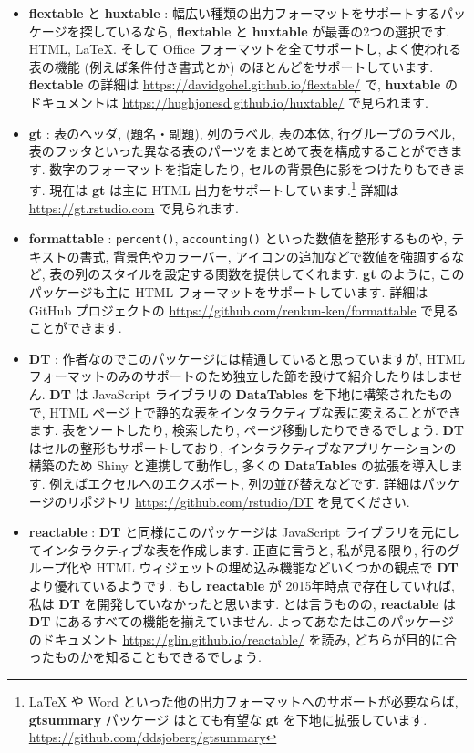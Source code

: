 \documentclass[
  11pt,
  lualatex,
  ja=standard]{bxjsreport}
\begin{document}
\begin{itemize}
\item
  \textbf{flextable} \autocite{R-flextable} と \textbf{huxtable} \autocite{R-huxtable}: 幅広い種類の出力フォーマットをサポートするパッケージを探しているなら, \textbf{flextable} と \textbf{huxtable} が最善の2つの選択です. HTML, LaTeX. そして Office フォーマットを全てサポートし, よく使われる表の機能 (例えば条件付き書式とか) のほとんどをサポートしています. \textbf{flextable} の詳細は \url{https://davidgohel.github.io/flextable/} で, \textbf{huxtable} のドキュメントは \url{https://hughjonesd.github.io/huxtable/} で見られます.
\item
  \textbf{gt} \autocite{R-gt}: 表のヘッダ, (題名・副題), 列のラベル, 表の本体, 行グループのラベル, 表のフッタといった異なる表のパーツをまとめて表を構成することができます. 数字のフォーマットを指定したり, セルの背景色に影をつけたりもできます. 現在は \textbf{gt} は主に HTML 出力をサポートしています.\footnote{LaTeX や Word といった他の出力フォーマットへのサポートが必要ならば, \textbf{gtsummary} パッケージ \autocite{R-gtsummary} はとても有望な \textbf{gt} を下地に拡張しています. \url{https://github.com/ddsjoberg/gtsummary}} 詳細は \url{https://gt.rstudio.com} で見られます.
\item
  \textbf{formattable} \autocite{R-formattable}: \texttt{percent()}, \texttt{accounting()} といった数値を整形するものや, テキストの書式, 背景色やカラーバー, アイコンの追加などで数値を強調するなど, 表の列のスタイルを設定する関数を提供してくれます. \textbf{gt} のように, このパッケージも主に HTML フォーマットをサポートしています. 詳細は GitHub プロジェクトの \url{https://github.com/renkun-ken/formattable} で見ることができます.
\item
  \textbf{DT} \autocite{R-DT}: 作者なのでこのパッケージには精通していると思っていますが, HTML フォーマットのみのサポートのため独立した節を設けて紹介したりはしません. \textbf{DT} は JavaScript ライブラリの \textbf{DataTables} を下地に構築されたもので, HTML ページ上で静的な表をインタラクティブな表に変えることができます. 表をソートしたり, 検索したり, ページ移動したりできるでしょう. \textbf{DT} はセルの整形もサポートしており, インタラクティブなアプリケーションの構築のため Shiny と連携して動作し, 多くの \textbf{DataTables} の拡張を導入します. 例えばエクセルへのエクスポート, 列の並び替えなどです. 詳細はパッケージのリポジトリ \url{https://github.com/rstudio/DT} を見てください.
\item
  \textbf{reactable} \autocite{R-reactable}: \textbf{DT} と同様にこのパッケージは JavaScript ライブラリを元にしてインタラクティブな表を作成します. 正直に言うと, 私が見る限り, 行のグループ化や HTML ウィジェットの埋め込み機能などいくつかの観点で \textbf{DT} より優れているようです. もし \textbf{reactable} が 2015年時点で存在していれば, 私は \textbf{DT} を開発していなかったと思います. とは言うものの, \textbf{reactable} は\textbf{DT} にあるすべての機能を揃えていません. よってあなたはこのパッケージのドキュメント \url{https://glin.github.io/reactable/} を読み, どちらが目的に合ったものかを知ることもできるでしょう.

\end{itemize}
\end{document}
